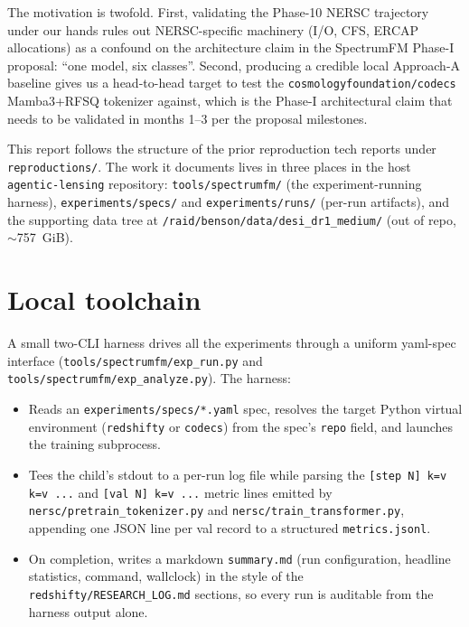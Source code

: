 \documentclass[11pt,letterpaper]{article}
\begin{document}
The motivation is twofold. First, validating the Phase-10 NERSC
trajectory under our hands rules out NERSC-specific machinery
(I/O, CFS, ERCAP allocations) as a confound on the architecture claim
in the SpectrumFM Phase-I proposal: ``one model, six classes''. Second,
producing a credible local Approach-A baseline gives us a head-to-head
target to test the
\texttt{cosmologyfoundation/codecs} Mamba3+RFSQ tokenizer against,
which is the Phase-I architectural claim that needs to be validated
in months 1--3 per the proposal milestones.

This report follows the structure of the prior reproduction tech
reports under \texttt{reproductions/}. The work it documents lives
in three places in the host \texttt{agentic-lensing} repository:
\texttt{tools/spectrumfm/} (the experiment-running harness),
\texttt{experiments/specs/} and \texttt{experiments/runs/} (per-run
artifacts), and the supporting data tree at
\texttt{/raid/benson/data/desi\_dr1\_medium/} (out of repo,
$\sim$757~GiB).

\section{Local toolchain}

A small two-CLI harness drives all the experiments through a uniform
yaml-spec interface (\texttt{tools/spectrumfm/exp\_run.py} and
\texttt{tools/spectrumfm/exp\_analyze.py}). The harness:

\begin{itemize}
\item Reads an \texttt{experiments/specs/*.yaml} spec, resolves the
      target Python virtual environment (\texttt{redshifty} or
      \texttt{codecs}) from the spec's \texttt{repo} field, and
      launches the training subprocess.
\item Tees the child's stdout to a per-run log file while parsing the
      \texttt{[step N] k=v k=v ...} and \texttt{[val N] k=v ...} metric
      lines emitted by \texttt{nersc/pretrain\_tokenizer.py} and
      \texttt{nersc/train\_transformer.py}, appending one JSON line per
      val record to a structured \texttt{metrics.jsonl}.
\item On completion, writes a markdown \texttt{summary.md} (run
      configuration, headline statistics, command, wallclock) in the
      style of the \texttt{redshifty/RESEARCH\_LOG.md} sections, so
      every run is auditable from the harness output alone.
\end{itemize}
\end{document}
